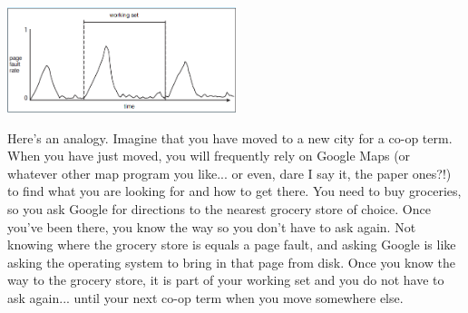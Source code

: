 \begin{center}
	\includegraphics[width=0.5\textwidth]{images/workingset.png}
\end{center}

Here's an analogy. Imagine that you have moved to a new city for a co-op term. When you have just moved, you will frequently rely on Google Maps (or whatever other map program you like... or even, dare I say it, the paper ones?!) to find what you are looking for and how to get there. You need to buy groceries, so you ask Google for directions to the nearest grocery store of choice. Once you've been there, you know the way so you don't have to ask again. Not knowing where the grocery store is equals a page fault, and asking Google is like asking the operating system to bring in that page from disk. Once you know the way to the grocery store, it is part of your working set and you do not have to ask again... until your next co-op term when you move somewhere else.



